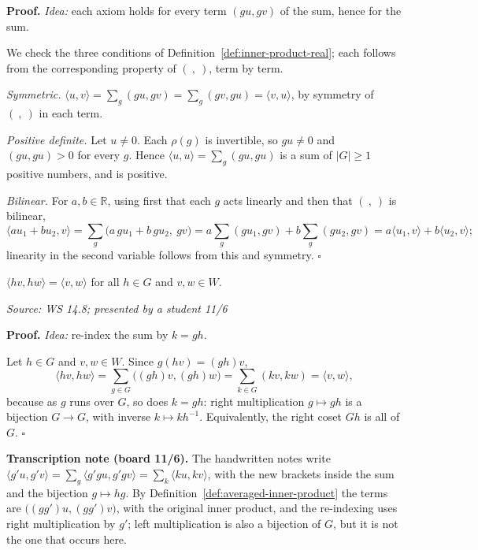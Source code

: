 \documentclass[11pt]{report}
\renewenvironment{proof}[1][Proof]{\noindent\textbf{#1.} }{\hfill$\square$\par\vspace{5pt}}
\newcommand{\srcline}[1]{\par\hfill{\footnotesize\textit{Source: #1}}}
\begin{document}
\begin{proof}
\textit{Idea:} each axiom holds for every term $(gu, gv)$ of the sum, hence for the sum.\par
We check the three conditions of Definition~\ref{def:inner-product-real}; each follows from the corresponding property of $(\ ,\ )$, term by term.

\emph{Symmetric.} $\langle u, v \rangle = \sum_g (gu, gv) = \sum_g (gv, gu) = \langle v, u \rangle$, by symmetry of $(\ ,\ )$ in each term.

\emph{Positive definite.} Let $u \neq 0$. Each $\rho(g)$ is invertible, so $gu \neq 0$ and $(gu, gu) > 0$ for every $g$. Hence $\langle u, u \rangle = \sum_g (gu, gu)$ is a sum of $|G| \geq 1$ positive numbers, and is positive.

\emph{Bilinear.} For $a, b \in \mathbb{R}$, using first that each $g$ acts linearly and then that $(\ ,\ )$ is bilinear,
\[ \langle au_1 + bu_2, v \rangle = \sum_g \big(a\,gu_1 + b\,gu_2,\ gv\big) = a\sum_g (gu_1, gv) + b\sum_g (gu_2, gv) = a\langle u_1, v \rangle + b\langle u_2, v \rangle; \]
linearity in the second variable follows from this and symmetry.
\end{proof}

\begin{propbox}\label{prop:averaged-inner-product-preserved}
$\langle hv, hw \rangle = \langle v, w \rangle$ for all $h \in G$ and $v, w \in W$.
\srcline{WS 14.8; presented by a student 11/6}
\end{propbox}

\begin{proof}
\textit{Idea:} re-index the sum by $k = gh$.\par
Let $h \in G$ and $v, w \in W$. Since $g(hv) = (gh)v$,
\[ \langle hv, hw \rangle = \sum_{g \in G} \big((gh)v, (gh)w\big) = \sum_{k \in G} (kv, kw) = \langle v, w \rangle, \]
because as $g$ runs over $G$, so does $k = gh$: right multiplication $g \mapsto gh$ is a bijection $G \to G$, with inverse $k \mapsto kh^{-1}$. Equivalently, the right coset $Gh$ is all of $G$.
\end{proof}

\textbf{Transcription note (board 11/6).} The handwritten notes write $\langle g'u, g'v \rangle = \sum_{g} \langle g'gu, g'gv \rangle = \sum_{k} \langle ku, kv \rangle$, with the new brackets inside the sum and the bijection $g \mapsto hg$. By Definition~\ref{def:averaged-inner-product} the terms are $\big((gg')u, (gg')v\big)$, with the original inner product, and the re-indexing uses right multiplication by $g'$; left multiplication is also a bijection of $G$, but it is not the one that occurs here.
\end{document}
